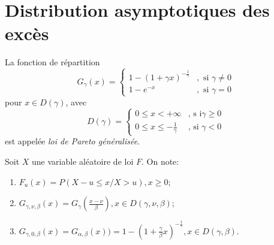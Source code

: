 \documentclass[10p,a4paper,reqno,titlepage]{report}
\begin{document}
\chapter{Distribution asymptotiques des excès}
\begin{de}
	La fonction de répartition 
	$$G_\gamma (x) = \left\{\begin{array}{ll} 1 -(1+\gamma x)^{-\tfrac{1}{\gamma}}& , \text{ si }\gamma \neq 0 \\ 1 - e^{-x}& ,\text{ si }\gamma = 0
		\end{array}\right.$$
	pour $x \in D(\gamma)$, avec
	 $$ D (\gamma )= \left\{\begin{array}{ll}0 \leq x < + \infty & \text{, s i} \gamma \geq 0\\ 0 \leq x \leq -\tfrac{1}{\gamma} & \text{, si } \gamma < 0
	 	 \end{array}\right.$$
 	 est appelée \textit{loi de Pareto généralisée}.
\end{de}
\begin{nota} Soit $X$ une variable aléatoire de loi $F$. On note:\
	\begin{enumerate}
		\item $F_u (x) =P( X- u \leq x / X>u), x \geq 0$;
		\item $G_{\gamma, \nu,\beta}(x)= G_\gamma (\tfrac{x -\nu}{\beta}), x \in D(\gamma, \nu , \beta)$;
		\item $G_{\gamma, 0 ,\beta}(x)= G_{\alpha,\beta}(x))= 1 - (1+ \tfrac{\gamma}{\beta}x)^{-\tfrac{1}{\gamma}}, x \in D (\gamma, \beta).$
	\end{enumerate}
\end{nota}
\end{document}

